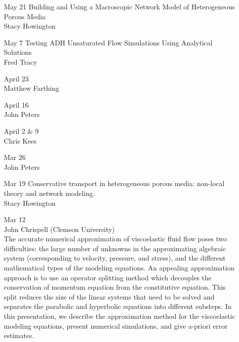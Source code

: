 \documentclass[12]{article}
\begin{document}
\begin{enumerate}
\item[May 21] Building and Using a Macroscopic Network Model of Heterogeneous Porous Media\\
Stacy Howington 

\item[May 7] Testing ADH Unsaturated Flow Simulations Using Analytical
Solutions \\
Fred Tracy

\item[April 23] \\
Matthew Farthing

\item[April 16] \\
John Peters

\item[April 2 \& 9] \\
Chris Kees

\item[Mar 26] \\
  John Peters

\item[Mar 19] Conservative transport in heterogeneous porous media:  non-local theory and
network modeling.\\
Stacy Howington

\item[Mar 12]  \\
John Chrispell (Clemson University)\\
The accurate numerical approximation of viscoelastic fluid flow poses two
difficulties: the large number of unknowns in the approximating algebraic
system (corresponding to velocity, pressure, and stress), and the
different mathematical types of the modeling equations. An appealing
approximation approach is to use an operator splitting method which
decouples the conservation of momentum equation from the constitutive
equation. This split reduces the size of the linear systems that need to
be solved and separates the parabolic and hyperbolic equations into
different substeps. In this presentation, we describe the approximation 
method for the viscoelastic modeling equations, present numerical
simulations, and give a-priori error estimates.


\end{enumerate}
\end{document}
